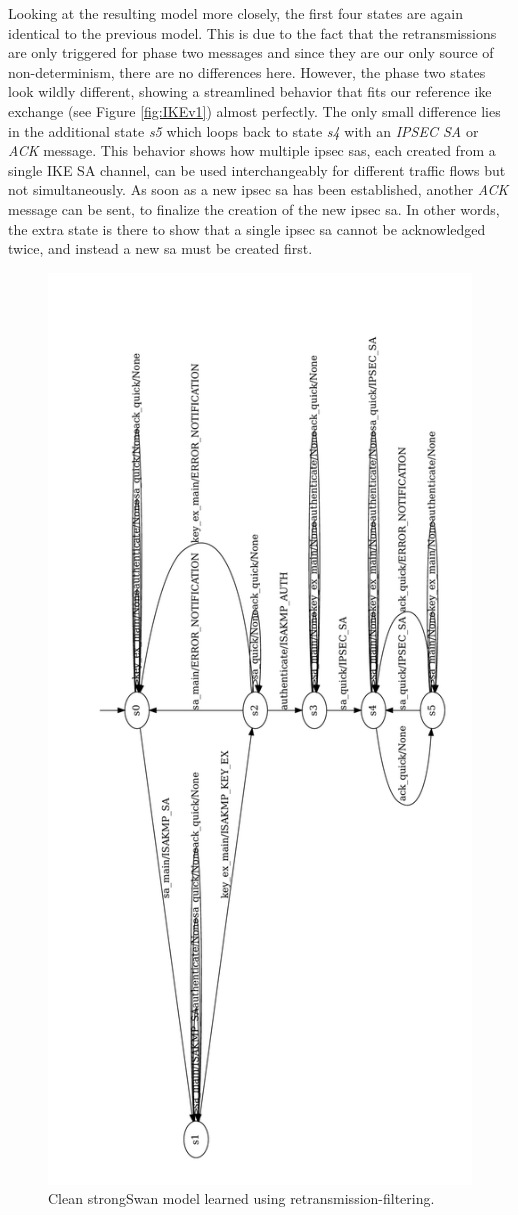 Looking at the resulting model more closely, the first four states are again identical to the previous model. This is due to the fact that the retransmissions are only triggered for phase two messages and since they are our only source of non-determinism, there are no differences here. However, the phase two states look wildly different, showing a streamlined behavior that fits our reference \ac{ike} exchange (see Figure \ref{fig:IKEv1}) almost perfectly. The only small difference lies in the additional state \emph{s5} which loops back to state \emph{s4} with an \emph{IPSEC SA} or \emph{ACK} message. This behavior shows how multiple \ac{ipsec} \acp{sa}, each created from a single IKE SA channel, can be used interchangeably for different traffic flows but not simultaneously. As soon as a new \ac{ipsec} \ac{sa} has been established, another \emph{ACK} message can be sent, to finalize the creation of the new \ac{ipsec} \ac{sa}. In other words, the extra state is there to show that a single \ac{ipsec} \ac{sa} cannot be acknowledged twice, and instead a new \ac{sa} must be created first. 

\begin{figure}[H]
	\includegraphics[width=0.7\linewidth]{images/models/Reference_rotated}
	\caption{Clean strongSwan model learned using retransmission-filtering.}
	\label{fig:reference}
\end{figure}

